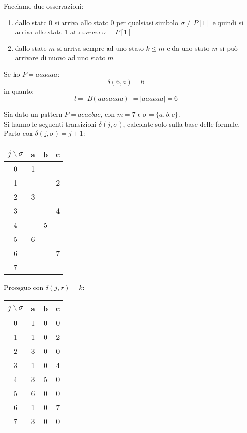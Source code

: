 Facciamo due osservazioni:
\begin{enumerate}
  \item dallo stato 0 si arriva allo stato 0 per qualsiasi simbolo $\sigma\neq
  P[1]$ e quindi si arriva allo stato 1 attraverso $\sigma =P[1]$
  \item dallo stato $m$ si arriva sempre ad uno stato $k\leq m$ e da uno stato
  $m$ si può arrivare di nuovo ad uno stato $m$
\end{enumerate}
\begin{esempio}
  Se ho $P=aaaaaa$:
  \[\delta(6,a)=6\]
  in quanto:
  \[l=|B(aaaaaaa)|=|aaaaaa|=6\]
\end{esempio}
\begin{esempio}
  Sia dato un pattern $P=acacbac$, con $m=7$ e $\sigma=\{a,b,c\}$.\\
  Si hanno le seguenti transizioni $\delta(j,\sigma)$, calcolate solo sulla base
  delle formule.\\
  Parto con $\delta(j,\sigma)=j+1$:
  \begin{table}[H]
    \centering
    \begin{tabular}[H]{c||c|c|c}
      $j\backslash\sigma$ & a & b & c\\
      \hline
      \hline
      0 & 1 & & \\
      1 & & & 2\\
      2 & 3 & & \\
      3 & & & 4\\
      4 & & 5 & \\ 
      5 & 6 & & \\
      6 & & & 7\\
      7 & & &       
    \end{tabular}
  \end{table}
  Proseguo con $\delta(j,\sigma)=k$:
  \begin{table}[H]
    \centering
    \begin{tabular}[H]{c||c|c|c}
      $j\backslash\sigma$ & a & b & c\\
      \hline
      \hline
      0 & 1 & 0 & 0\\
      1 & 1 & 0 & 2\\
      2 & 3 & 0 & 0\\
      3 & 1 & 0 & 4\\
      4 & 3 & 5 & 0\\ 
      5 & 6 & 0 & 0\\
      6 & 1 & 0 & 7\\
      7 & 3 & 0 & 0      
    \end{tabular}
  \end{table}
\end{esempio}
